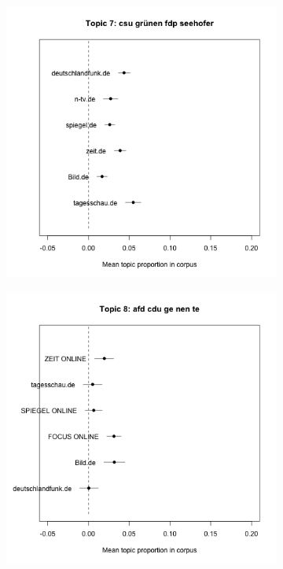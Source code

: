 \documentclass[12pt,a4paper,notitlepage]{article}
\begin{document}
\begin{figure}[H]
\begin{center}
\begin{subfigure}[normla]{0.2\textwidth}
		\end{subfigure}
		\begin{subfigure}[normla]{0.2\textwidth}
			\includegraphics[width=\textwidth]{../figs/estimate_effect7.png}
		\end{subfigure}
		\begin{subfigure}[normla]{0.2\textwidth}
			\includegraphics[width=\textwidth]{../figs/estimate_effect8.png}

\end{subfigure}
\end{center}
\end{figure}
\end{document}
